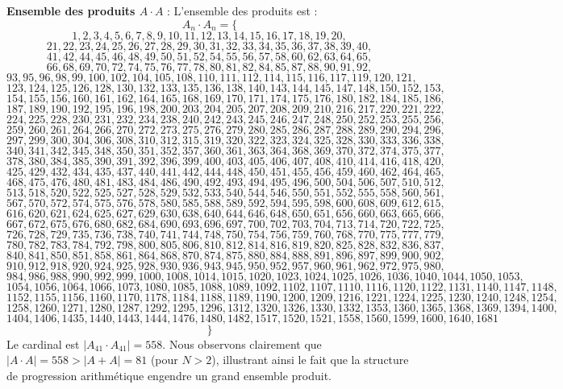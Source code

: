 \documentclass[11pt,a4paper]{article}
\begin{document}
\textbf{Ensemble des produits $A \cdot A$} :
L'ensemble des produits est :
$$ A_{{{n}}} \cdot A_{{{n}}} = \{ $$$$ 1, 2, 3, 4, 5, 6, 7, 8, 9, 10, 11, 12, 13, 14, 15, 16, 17, 18, 19, 20, $$$$ 21, 22, 23, 24, 25, 26, 27, 28, 29, 30, 31, 32, 33, 34, 35, 36, 37, 38, 39, 40, $$$$ 41, 42, 44, 45, 46, 48, 49, 50, 51, 52, 54, 55, 56, 57, 58, 60, 62, 63, 64, 65, $$$$ 66, 68, 69, 70, 72, 74, 75, 76, 77, 78, 80, 81, 82, 84, 85, 87, 88, 90, 91, 92, $$$$ 93, 95, 96, 98, 99, 100, 102, 104, 105, 108, 110, 111, 112, 114, 115, 116, 117, 119, 120, 121, $$$$ 123, 124, 125, 126, 128, 130, 132, 133, 135, 136, 138, 140, 143, 144, 145, 147, 148, 150, 152, 153, $$$$ 154, 155, 156, 160, 161, 162, 164, 165, 168, 169, 170, 171, 174, 175, 176, 180, 182, 184, 185, 186, $$$$ 187, 189, 190, 192, 195, 196, 198, 200, 203, 204, 205, 207, 208, 209, 210, 216, 217, 220, 221, 222, $$$$ 224, 225, 228, 230, 231, 232, 234, 238, 240, 242, 243, 245, 246, 247, 248, 250, 252, 253, 255, 256, $$$$ 259, 260, 261, 264, 266, 270, 272, 273, 275, 276, 279, 280, 285, 286, 287, 288, 289, 290, 294, 296, $$$$ 297, 299, 300, 304, 306, 308, 310, 312, 315, 319, 320, 322, 323, 324, 325, 328, 330, 333, 336, 338, $$$$ 340, 341, 342, 345, 348, 350, 351, 352, 357, 360, 361, 363, 364, 368, 369, 370, 372, 374, 375, 377, $$$$ 378, 380, 384, 385, 390, 391, 392, 396, 399, 400, 403, 405, 406, 407, 408, 410, 414, 416, 418, 420, $$$$ 425, 429, 432, 434, 435, 437, 440, 441, 442, 444, 448, 450, 451, 455, 456, 459, 460, 462, 464, 465, $$$$ 468, 475, 476, 480, 481, 483, 484, 486, 490, 492, 493, 494, 495, 496, 500, 504, 506, 507, 510, 512, $$$$ 513, 518, 520, 522, 525, 527, 528, 529, 532, 533, 540, 544, 546, 550, 551, 552, 555, 558, 560, 561, $$$$ 567, 570, 572, 574, 575, 576, 578, 580, 585, 588, 589, 592, 594, 595, 598, 600, 608, 609, 612, 615, $$$$ 616, 620, 621, 624, 625, 627, 629, 630, 638, 640, 644, 646, 648, 650, 651, 656, 660, 663, 665, 666, $$$$ 667, 672, 675, 676, 680, 682, 684, 690, 693, 696, 697, 700, 702, 703, 704, 713, 714, 720, 722, 725, $$$$ 726, 728, 729, 735, 736, 738, 740, 741, 744, 748, 750, 754, 756, 759, 760, 768, 770, 775, 777, 779, $$$$ 780, 782, 783, 784, 792, 798, 800, 805, 806, 810, 812, 814, 816, 819, 820, 825, 828, 832, 836, 837, $$$$ 840, 841, 850, 851, 858, 861, 864, 868, 870, 874, 875, 880, 884, 888, 891, 896, 897, 899, 900, 902, $$$$ 910, 912, 918, 920, 924, 925, 928, 930, 936, 943, 945, 950, 952, 957, 960, 961, 962, 972, 975, 980, $$$$ 984, 986, 988, 990, 992, 999, 1000, 1008, 1014, 1015, 1020, 1023, 1024, 1025, 1026, 1036, 1040, 1044, 1050, 1053, $$$$ 1054, 1056, 1064, 1066, 1073, 1080, 1085, 1088, 1089, 1092, 1102, 1107, 1110, 1116, 1120, 1122, 1131, 1140, 1147, 1148, $$$$ 1152, 1155, 1156, 1160, 1170, 1178, 1184, 1188, 1189, 1190, 1200, 1209, 1216, 1221, 1224, 1225, 1230, 1240, 1248, 1254, $$$$ 1258, 1260, 1271, 1280, 1287, 1292, 1295, 1296, 1312, 1320, 1326, 1330, 1332, 1353, 1360, 1365, 1368, 1369, 1394, 1400, $$$$ 1404, 1406, 1435, 1440, 1443, 1444, 1476, 1480, 1482, 1517, 1520, 1521, 1558, 1560, 1599, 1600, 1640, 1681 $$$$ \} $$
Le cardinal est $|A_{41} \cdot A_{41}| = 558$.
Nous observons clairement que $|A \cdot A| = 558 > |A+A| = 81$ (pour $N > 2$), illustrant ainsi le fait que la structure de progression arithmétique engendre un grand ensemble produit.
\newpage
\end{document}
